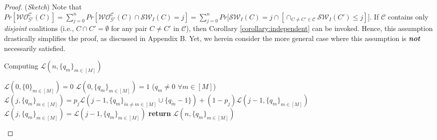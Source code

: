 \documentclass[letterpaper]{article} %
\begin{document}
\begin{proof}
(\textit{Sketch}) Note that $Pr[\mathcal{WO}^{\mathcal{C}}_{\mathcal{G}'}(C)] = \sum_{j=0}^{n} Pr[\mathcal{WO}^{\mathcal{C}}_{\mathcal{G}'}(C) \cap \mathcal{SW}_I(C) = j] = \sum_{j=0}^n Pr\big[\mathcal{SW}_I(C) = j \cap [\cap_{C \neq C' \in \mathcal{C}} \mathcal{SW}_I(C') \leq j]\big]$. If $\mathcal{C}$ contains only \textit{disjoint} coalitions (i.e., $C \cap C' = \emptyset$ for any pair $C \neq C'$ in $\mathcal{C}$), then Corollary \ref{corollary:independent} can be invoked. Hence, this assumption drastically simplifies the proof, as discussed in Appendix B. Yet, we herein consider the more general case where this assumption is \textit{\textbf{not}} necessarily satisfied.
%

\begin{algorithm}[tb]
\caption{Computing $\mathcal{L}(n,\{q_m\}_{m \in [M]})$}
\label{alg:poly many}
\begin{algorithmic}[1] %
\STATE $\mathcal{L}(0,\{0\}_{m \in [M]}) = 0$
\STATE $\mathcal{L}(0,\{q_m\}_{m \in [M]}) = 1$ ($q_m \neq 0$ $\forall m \in [M]$)
\STATE $\mathcal{L}(j,\{q_m\}_{m \in [M]}) = p_j \mathcal{L}(j-1,\{q_m\}_{\tilde{m} \neq m \in [M]} \cup \{q_{\tilde{m}} - 1\}) + (1-p_j) \mathcal{L}(j-1,\{q_m\}_{m \in [M]})$
\ELSE
\STATE $\mathcal{L}(j,\{q_m\}_{m \in [M]}) = \mathcal{L}(j-1,\{q_m\}_{m \in [M]})$
\ENDIF
\ENDFOR
\STATE \textbf{return} $\mathcal{L}(n,\{q_m\}_{m \in [M]})$
\end{algorithmic}
\end{algorithm}


\end{proof}
\end{document}
